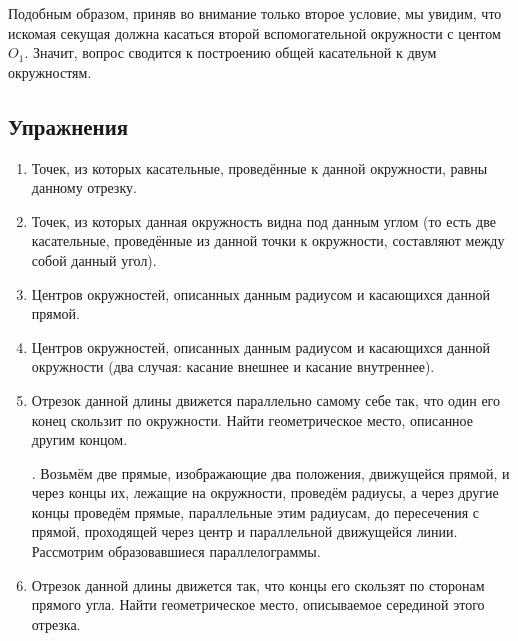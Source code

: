\documentclass[twoside]{book}
\begin{document}
Подобным образом, приняв во внимание только второе условие, мы увидим, что искомая секущая должна касаться второй вспомогательной окружности с центом $O_1$.
Значит, вопрос сводится к построению общей касательной к двум окружностям.

\subsection*{Упражнения}

\begin{center}
\end{center}

\begin{enumerate}

 \item
Точек, из которых касательные, проведённые к данной окружности, равны данному отрезку.

 \item
Точек, из которых данная окружность видна под данным углом (то есть две касательные, проведённые из данной точки к окружности, составляют между собой данный угол).

 \item
Центров окружностей, описанных данным радиусом и касающихся данной прямой.

 \item
Центров окружностей, описанных данным радиусом и касающихся данной окружности (два случая:
касание внешнее и касание внутреннее).

 \item
Отрезок данной длины движется параллельно самому себе так, что один его конец скользит по окружности.
Найти геометрическое место, описанное другим концом.

\smallskip
{}.
Возьмём две прямые, изображающие два положения, движущейся прямой, и через концы их, лежащие на окружности, проведём радиусы, а через другие концы проведём прямые, параллельные этим радиусам, до пересечения с прямой, проходящей через центр и параллельной движущейся линии.
Рассмотрим образовавшиеся параллелограммы.

 \item
Отрезок данной длины движется так, что концы его скользят по сторонам прямого угла.
Найти геометрическое место, описываемое серединой этого отрезка.

\end{enumerate}

\begin{center}
\end{center}
\end{document}
